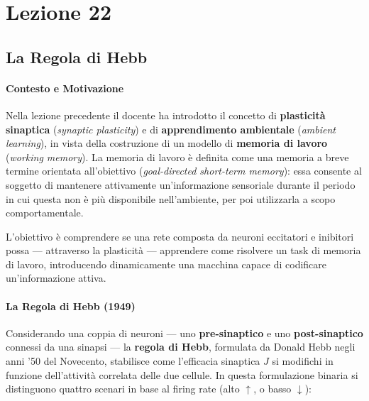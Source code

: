 \chapter{Lezione 22}


\section{La Regola di Hebb}

\subsubsection{Contesto e Motivazione}

Nella lezione precedente il docente ha introdotto il concetto di \textbf{plasticità sinaptica} (\textit{synaptic plasticity}) e di \textbf{apprendimento ambientale} (\textit{ambient learning}), in vista della costruzione di un modello di \textbf{memoria di lavoro} (\textit{working memory}). La memoria di lavoro è definita come una memoria a breve termine orientata all'obiettivo (\textit{goal-directed short-term memory}): essa consente al soggetto di mantenere attivamente un'informazione sensoriale durante il periodo in cui questa non è più disponibile nell'ambiente, per poi utilizzarla a scopo comportamentale.

L'obiettivo è comprendere se una rete composta da neuroni eccitatori e inibitori possa — attraverso la plasticità — apprendere come risolvere un task di memoria di lavoro, introducendo dinamicamente una macchina capace di codificare un'informazione attiva.

\subsubsection{La Regola di Hebb (1949)}

Considerando una coppia di neuroni — uno \textbf{pre-sinaptico} e uno \textbf{post-sinaptico} connessi da una sinapsi — la \textbf{regola di Hebb}, formulata da Donald Hebb negli anni '50 del Novecento, stabilisce come l'efficacia sinaptica $J$ si modifichi in funzione dell'attività correlata delle due cellule. In questa formulazione binaria si distinguono quattro scenari in base al firing rate (alto $\uparrow$, o basso $\downarrow$):

